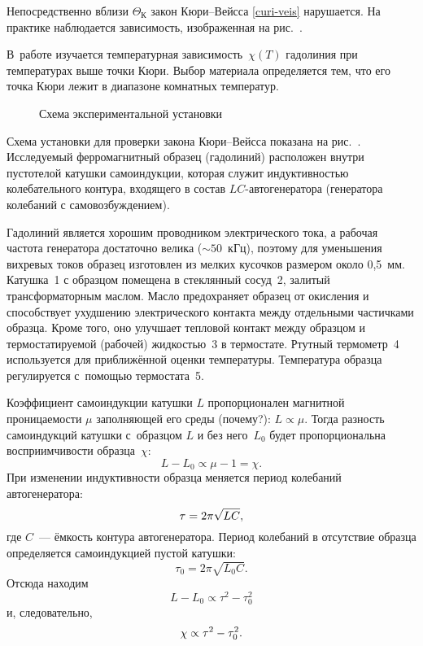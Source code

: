 
Непосредственно вблизи $\Theta_К$ закон Кюри--Вейсса
\eqref{curi-veis} нарушается. На практике наблюдается зависимость, изображенная
на рис.~.

\experiment

В~работе изучается температурная зависимость~$\chi(T)$ гадолиния при
температурах выше точки Кюри. Выбор материала определяется тем, что его точка
Кюри лежит в диапазоне комнатных температур.

\begin{figure}[h!]
    \centering\small
    \caption{Схема экспериментальной установки}
\end{figure}

Схема установки для проверки закона Кюри--Вейсса показана на рис.~.
Исследуемый ферромагнитный образец (гадолиний) расположен внутри пустотелой
катушки самоиндукции, которая служит индуктивностью колебательного контура,
входящего в состав $LC$-авто\-генератора (генератора колебаний с
самовозбуждением).

Гадолиний является хорошим проводником электрического тока, а рабочая частота
генератора достаточно велика (${\sim}50$~кГц), поэтому для уменьшения вихревых
токов образец изготовлен из мелких кусочков размером около 0,5~мм.
Катушка~1 с образцом помещена в стеклянный сосуд~2, залитый трансформаторным
маслом. Масло предохраняет образец от окисления и способствует ухудшению
электрического контакта между отдельными частичками образца. Кроме того, оно
улучшает тепловой контакт между образцом и термостатируемой (рабочей)
жидкостью~3 в термостате. Ртутный термометр~4 используется для приближённой
оценки температуры. Температура образца регулируется с~помощью термостата~5.

Коэффициент самоиндукции катушки $L$ пропорционален магнитной
проницаемости $\mu$ заполняющей его среды (почему?): $L\propto \mu$.
Тогда разность самоиндукций катушки с~образцом $L$ и без него~$L_0$
будет пропорциональна восприимчивости образца~$\chi$:
\begin{equation*}%
	L-L_0\propto \mu - 1 = \chi.
\end{equation*}
При изменении индуктивности образца меняется период колебаний автогенератора:
\begin{equation*}%
	\tau=2\pi\sqrt{LC},
	\eqmark{4}
\end{equation*}
где $C$~--- ёмкость контура автогенератора.
Период колебаний в отсутствие образца определяется самоиндукцией пустой катушки:
\begin{equation*}
	\tau_0=2\pi\sqrt{L_0 C}.
\end{equation*}
Отсюда находим
\begin{equation*}
	L-L_0 \propto \tau^2-\tau_0^2
\end{equation*}
и, следовательно,
\begin{equation}%
	\eqmark{6}
	\chi\propto \tau^2-\tau_0^2.
\end{equation}

